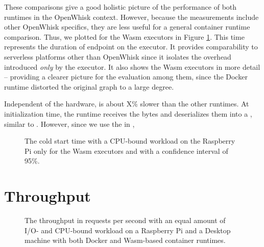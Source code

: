 These comparisons give a good holistic picture of the performance of both runtimes in the OpenWhisk context. However, because the measurements include other OpenWhisk specifics, they are less useful for a general container runtime comparison. Thus, we plotted  for the Wasm executors in Figure \ref{fig:pc-pi-cold-start-wasm-only}. This time represents the duration of  endpoint on the executor. It provides comparability to serverless platforms other than OpenWhisk since it isolates the overhead introduced \emph{only} by the executor. It also shows the Wasm executors in more detail -- providing a clearer picture for the evaluation among them, since the Docker runtime distorted the original graph to a large degree.

Independent of the hardware,  is about X\% slower than the other runtimes. At initialization time, the runtime receives the bytes and deserializes them into a , similar to . However, since we use the  in , 

\begin{figure}
    \begin{center}
        
    \end{center}
    \caption{The cold start time with a CPU-bound workload on the Raspberry Pi only for the Wasm executors and with a confidence interval of 95\%.}
    \label{fig:pc-pi-cold-start-wasm-only}
\end{figure}



\section{Throughput}

\begin{figure}
    \begin{center}
        
    \end{center}
    \caption{The throughput in requests per second with an equal amount of I/O- and CPU-bound workload on a Raspberry Pi and a Desktop machine with both Docker and Wasm-based container runtimes.}
    \label{fig:pi-pc-load-mixed}
\end{figure}

